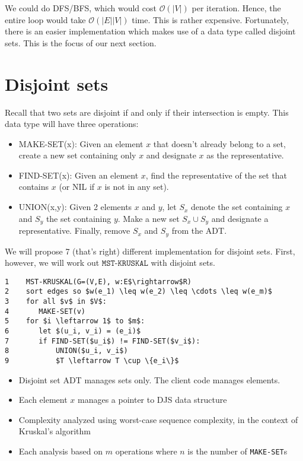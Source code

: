 \documentclass[11pt]{article}
\begin{document}
We could do DFS/BFS, which would cost $\mathcal{O}(|V|)$ per iteration. Hence, the entire loop would take $\mathcal{O}(|E||V|)$ time. This is rather expensive. Fortunately, there is an easier implementation which makes use of a data type called disjoint sets. This is the focus of our next section. 

\section{Disjoint sets}
Recall that two sets are disjoint if and only if their intersection is empty. This data type will have three operations: 
\begin{itemize}
    \item MAKE-SET(x): Given an element $x$ that doesn't already belong to a set, create a new set containing only $x$ and designate $x$ as the representative. 
    \item FIND-SET(x): Given an element $x$, find the representative of the set that contains $x$ (or NIL if  $x$ is not in any set). 
    \item UNION(x,y): Given 2 elements $x$ and $y$, let $S_x$ denote the set containing $x$ and $S_y$ the set containing $y$. Make a new set $S_x \cup S_y$ and designate a representative. Finally, remove $S_x$ and $S_y$ from the ADT. 
\end{itemize}
We will propose 7 (that's right) different implementation for disjoint sets. First, however, we will work out $\texttt{MST-KRUSKAL}$ with disjoint sets. 

\begin{lstlisting}
1    MST-KRUSKAL(G=(V,E), w:E$\rightarrow$R)
2    sort edges so $w(e_1) \leq w(e_2) \leq \cdots \leq w(e_m)$
3    for all $v$ in $V$: 
4       MAKE-SET(v)
5    for $i \leftarrow 1$ to $m$: 
6       let $(u_i, v_i) = (e_i)$
7       if FIND-SET($u_i$) != FIND-SET($v_i$):
8           UNION($u_i, v_i$)
9           $T \leftarrow T \cup \{e_i\}$
\end{lstlisting}

\begin{itemize}
    \item Disjoint set ADT manages sets only. The client code manages elements. 
    
    \item Each element $x$ manages a pointer to DJS data structure
    \item Complexity analyzed using worst-case sequence complexity, in the context of Kruskal's algorithm
    \item Each analysis based on $m$ operations where $n$ is the number of \texttt{MAKE-SET}s
\end{itemize}
\end{document}
